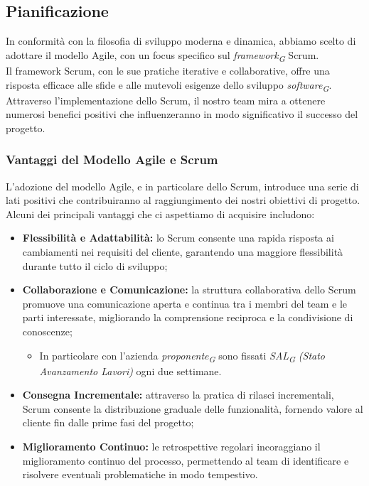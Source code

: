 \subsection{Pianificazione}\label{subsec:Pianificazione}
    In conformità con la filosofia di sviluppo moderna e dinamica, abbiamo scelto di adottare il modello Agile, con un focus specifico sul \textit{framework}\textsubscript{\textit{G}} Scrum. \\
    Il framework Scrum, con le sue pratiche iterative e collaborative, offre una risposta efficace alle sfide e alle mutevoli esigenze dello sviluppo \textit{software}\textsubscript{\textit{G}}.\\
    Attraverso l’implementazione dello Scrum, il nostro team mira a ottenere numerosi benefici positivi che influenzeranno in modo significativo il successo del progetto.
    

\subsubsection{Vantaggi del Modello Agile e Scrum}
    L'adozione del modello Agile, e in particolare dello Scrum, introduce una serie di lati positivi che contribuiranno al raggiungimento dei nostri obiettivi di progetto.
    Alcuni dei principali vantaggi che ci aspettiamo di acquisire includono:

\begin{itemize}
    \item \textbf{Flessibilità e Adattabilità:}
        lo Scrum consente una rapida risposta ai cambiamenti nei requisiti del cliente, garantendo una maggiore flessibilità durante tutto il ciclo di sviluppo;
    \item \textbf{Collaborazione e Comunicazione:}
        la struttura collaborativa dello Scrum promuove una comunicazione aperta e continua tra i membri del team e le parti interessate, migliorando la comprensione reciproca e la condivisione di conoscenze;
        \begin{itemize}
            \item In particolare con l'azienda \textit{proponente}\textsubscript{\textit{G}} sono fissati \textit{SAL}\textsubscript{\textit{G}} \textit{(Stato Avanzamento Lavori)} ogni due settimane.
        \end{itemize}
    \item \textbf{Consegna Incrementale:}
        attraverso la pratica di rilasci incrementali, Scrum consente la distribuzione graduale delle funzionalità, fornendo valore al cliente fin dalle prime fasi del progetto;
    \item \textbf{Miglioramento Continuo:}
        le retrospettive regolari incoraggiano il miglioramento continuo del processo, permettendo al team di identificare e risolvere eventuali problematiche in modo tempestivo.
\end{itemize}

